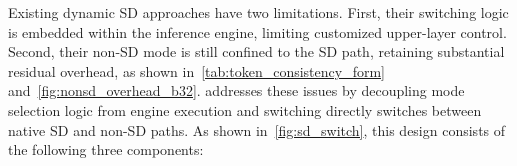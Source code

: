 Existing dynamic SD approaches have two limitations. First, their switching logic is embedded within the inference engine, limiting customized upper-layer control. Second, their non-SD mode is still confined to the SD path, retaining substantial residual overhead, as shown in~\autoref{tab:token_consistency_form} and~\autoref{fig:nonsd_overhead_b32}.
\sysname %
addresses these issues by decoupling mode selection logic from engine execution and switching directly switches between native SD and non-SD paths. As shown in~\autoref{fig:sd_switch}, this design consists of the following three components: %



